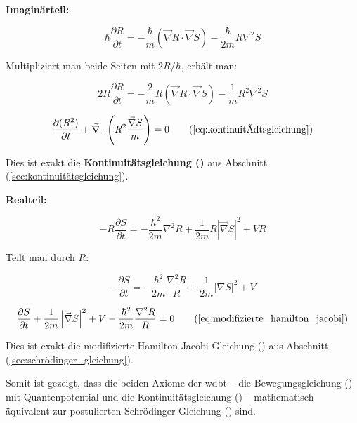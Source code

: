 \textbf{Imaginärteil:}

\begin{equation}
    \hbar \frac{\partial R}{\partial t} = -\frac{\hbar}{m} (\vec{\nabla} R \cdot \vec{\nabla} S) - \frac{\hbar}{2m} R \nabla^2 S
\end{equation}

Multipliziert man beide Seiten mit $2R/\hbar$, erhält man:

\begin{equation}
    2R \frac{\partial R}{\partial t} = -\frac{2}{m} R (\vec{\nabla} R \cdot \vec{\nabla} S) - \frac{1}{m} R^2 \nabla^2 S
\end{equation}

\begin{equation}
    \frac{\partial (R^2)}{\partial t} + \vec{\nabla} \cdot \left( R^2 \frac{\vec{\nabla} S}{m} \right) = 0 \tag{\refeq{eq:kontinuitätsgleichung}}
\end{equation}

Dies ist exakt die \textbf{Kontinuitätsgleichung ()} aus Abschnitt (\ref{sec:kontinuitätsgleichung}).

\textbf{Realteil:}

\begin{equation}
    - R \frac{\partial S}{\partial t} = -\frac{\hbar^2}{2m} \nabla^2 R + \frac{1}{2m} R \left| \vec{\nabla} S \right|^2 + V R
\end{equation}

Teilt man durch $R$:

\begin{equation}
    - \frac{\partial S}{\partial t} = -\frac{\hbar^2}{2m} \frac{\nabla^2 R}{R} + \frac{1}{2m} |\nabla S|^2 + V
\end{equation}

\begin{equation}
    \frac{\partial S}{\partial t} + \frac{1}{2m} \left| \vec{\nabla} S \right|^2 + V - \frac{\hbar^2}{2m} \frac{\nabla^2 R}{R} = 0 \tag{\refeq{eq:modifizierte_hamilton_jacobi}}
\end{equation}

Dies ist exakt die modifizierte Hamilton-Jacobi-Gleichung () aus Abschnitt (\ref{sec:schrödinger_gleichung}).

Somit ist gezeigt, dass die beiden Axiome der \gls{wdbt} – die Bewegungsgleichung () mit Quantenpotential und die Kontinuitätsgleichung
() – mathematisch äquivalent zur postulierten Schrödinger-Gleichung () sind.

